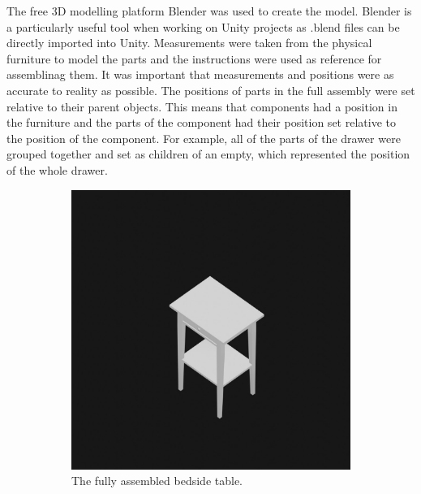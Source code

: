 \documentclass{l4proj}
\begin{document}
The free 3D modelling platform Blender was used to create the model. Blender is a particularly useful tool when working on Unity projects as .blend files can be directly imported into Unity. Measurements were taken from the physical furniture to model the parts and the instructions were used as reference for assemblinag them. It was important that measurements and positions were as accurate to reality as possible. The positions of parts in the full assembly were set relative to their parent objects. This means that components had a position in the furniture and the parts of the component had their position set relative to the position of the component. For example, all of the parts of the drawer were grouped together and set as children of an empty, which represented the position of the whole drawer.

\begin{figure}[hbt!]
    \centering
    \begin{subfigure}[b]{0.45\textwidth}
        \includegraphics[width=\textwidth]{dissertation/images/assembledModel.jpg}
        \caption{The fully assembled bedside table.}
        \label{fig:syn1}
    \end{subfigure}
    ~ %
    \begin{subfigure}[b]{0.45\textwidth}

\end{subfigure}
\end{figure}
\end{document}
